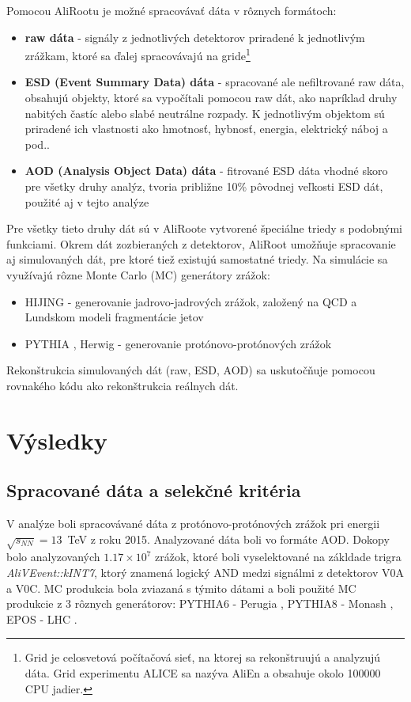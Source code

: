 \documentclass[thesismargins, thesislinespacing]{rnthesis}
\begin{document}
Pomocou AliRootu je možné spracovávať dáta v rôznych formátoch:
\begin{itemize}
	\item \textbf {raw dáta} - signály z jednotlivých detektorov priradené k jednotlivým zrážkam, ktoré sa ďalej spracovávajú na gride\footnote{Grid je celosvetová počítačová sieť, na ktorej sa rekonštruujú a analyzujú dáta. Grid experimentu ALICE sa nazýva AliEn a obsahuje okolo 100000 CPU jadier.} 
	\item \textbf {ESD (Event Summary Data) dáta} - spracované ale nefiltrované raw dáta, obsahujú objekty, ktoré sa vypočítali pomocou raw dát, ako napríklad druhy nabitých častíc alebo slabé neutrálne rozpady. K jednotlivým objektom sú priradené ich vlastnosti ako hmotnosť, hybnosť, energia, elektrický náboj a pod..
	\item \textbf {AOD (Analysis Object Data) dáta} - fitrované ESD dáta vhodné skoro pre všetky druhy analýz, tvoria približne 10\% pôvodnej veľkosti ESD dát, použité aj v tejto analýze
\end{itemize}

Pre všetky tieto druhy dát sú v AliRoote vytvorené špeciálne triedy s podobnými funkciami. Okrem dát zozbieraných z detektorov, AliRoot umožňuje spracovanie aj simulovaných dát, pre ktoré tiež existujú samostatné triedy. Na simulácie sa využívajú rôzne Monte Carlo (MC) generátory zrážok:
\begin{itemize}
	\item HIJING \cite{hijing} - generovanie jadrovo-jadrových zrážok, založený na QCD a Lundskom modeli fragmentácie jetov
	\item PYTHIA \cite{pythia}, Herwig \cite{herwig} - generovanie protónovo-protónových zrážok
\end{itemize}

Rekonštrukcia simulovaných dát (raw, ESD, AOD) sa uskutočňuje pomocou rovnakého kódu ako rekonštrukcia reálnych dát.

\chapter{Výsledky}

\section{Spracované dáta a selekčné kritéria}
V analýze boli spracovávané dáta z protónovo-protónových zrážok pri energii $\sqrt{s_{NN}}=13$~TeV z roku 2015. Analyzované dáta boli vo formáte AOD. Dokopy bolo analyzovaných $1.17\times10^7$ zrážok, ktoré boli vyselektované na zákldade trigra \textit{AliVEvent::kINT7}, ktorý znamená logický AND medzi signálmi z detektorov V0A a V0C.
MC produkcia bola zviazaná s týmito dátami a boli použité MC produkcie z 3 rôznych generátorov: PYTHIA6 - Perugia \cite{perugia} , PYTHIA8 - Monash \cite{monash}, EPOS - LHC \cite{epos}. 
\end{document}
